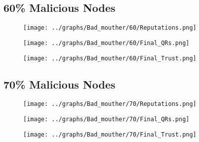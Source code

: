 \documentclass{article}
\begin{document}
  \begin{minipage}[t]{0.49\columnwidth}
    \subsection*{60\% Malicious Nodes}
        \begin{figure}[H]
            \centering
            \texttt{[image: ../graphs/Bad\_mouther/60/Reputations.png]}
        \end{figure}
        \begin{figure}[H]
            \centering
            \texttt{[image: ../graphs/Bad\_mouther/60/Final\_QRs.png]}
        \end{figure}
    \end{minipage}
    \begin{minipage}[t]{0.49\columnwidth}
        \begin{figure}[H]
            \centering
            \texttt{[image: ../graphs/Bad\_mouther/60/Final\_Trust.png]}
        \end{figure}
    \end{minipage}

  \begin{minipage}[t]{0.49\columnwidth}
    \subsection*{70\% Malicious Nodes}
        \begin{figure}[H]
            \centering
            \texttt{[image: ../graphs/Bad\_mouther/70/Reputations.png]}
        \end{figure}
        \begin{figure}[H]
            \centering
            \texttt{[image: ../graphs/Bad\_mouther/70/Final\_QRs.png]}
        \end{figure}
    \end{minipage}
    \begin{minipage}[t]{0.49\columnwidth}
        \begin{figure}[H]
            \centering
            \texttt{[image: ../graphs/Bad\_mouther/70/Final\_Trust.png]}
        \end{figure}
    \end{minipage}
\end{document}
